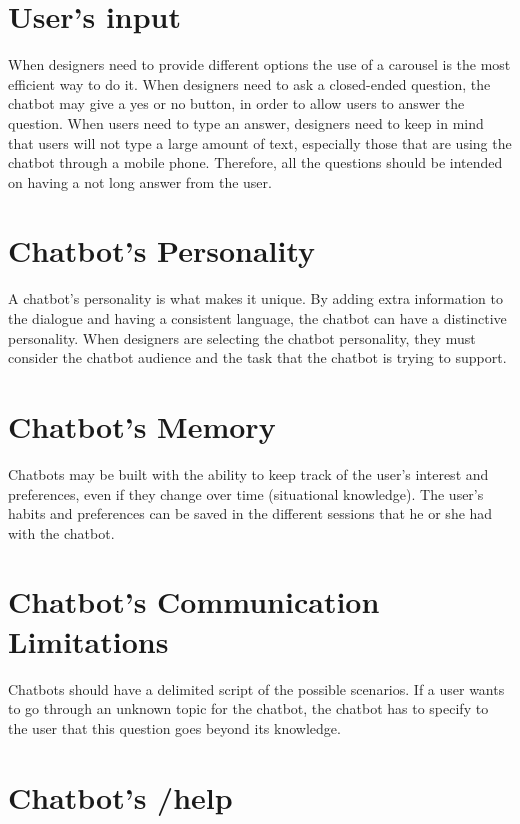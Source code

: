 \documentclass[a4paper,10pt]{article}
\begin{document}
\section{User's input}

When designers need to provide different options the use of a carousel is the most efficient way to do it. When designers need to ask a closed-ended question, the chatbot may give a yes or no button, in order to allow users to answer the question. When users need to type an answer, designers need to keep in mind that users will not type a large amount of text, especially those that are using the chatbot through a mobile phone. Therefore, all the questions should be intended on having a not long answer from the user. 

\section{Chatbot's Personality}

A chatbot’s personality is what makes it unique. By adding extra information to the dialogue and having a consistent language, the chatbot can have a distinctive personality. When designers are selecting the chatbot personality, they must consider the chatbot audience and the task that the chatbot is trying to support.

\section{Chatbot's Memory}

Chatbots may be built with the ability to keep track of the user’s interest and preferences, even if they change over time (situational knowledge).  The user’s habits and preferences can be saved in the different sessions that he or she had with the chatbot.

\section{Chatbot's Communication Limitations}

Chatbots should have a delimited script of the possible scenarios. If a user wants to go through an unknown topic for the chatbot, the chatbot has to specify to the user that this question goes beyond its knowledge.

\section{Chatbot's /help}
\end{document}
